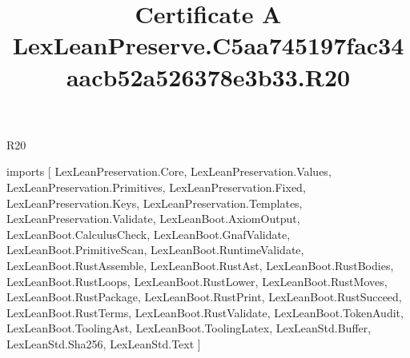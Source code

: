\begin{lexlean}{R20}
\title{Certificate A LexLeanPreserve.C5aa745197fac34aacb52a526378e3b33.R20}
\begin{coremodule}
imports [
  LexLeanPreservation.Core,
  LexLeanPreservation.Values,
  LexLeanPreservation.Primitives,
  LexLeanPreservation.Fixed,
  LexLeanPreservation.Keys,
  LexLeanPreservation.Templates,
  LexLeanPreservation.Validate,
  LexLeanBoot.AxiomOutput,
  LexLeanBoot.CalculusCheck,
  LexLeanBoot.GnafValidate,
  LexLeanBoot.PrimitiveScan,
  LexLeanBoot.RuntimeValidate,
  LexLeanBoot.RustAssemble,
  LexLeanBoot.RustAst,
  LexLeanBoot.RustBodies,
  LexLeanBoot.RustLoops,
  LexLeanBoot.RustLower,
  LexLeanBoot.RustMoves,
  LexLeanBoot.RustPackage,
  LexLeanBoot.RustPrint,
  LexLeanBoot.RustSucceed,
  LexLeanBoot.RustTerms,
  LexLeanBoot.RustValidate,
  LexLeanBoot.TokenAudit,
  LexLeanBoot.ToolingAst,
  LexLeanBoot.ToolingLatex,
  LexLeanStd.Buffer,
  LexLeanStd.Sha256,
  LexLeanStd.Text
]


\end{coremodule}
\end{lexlean}
